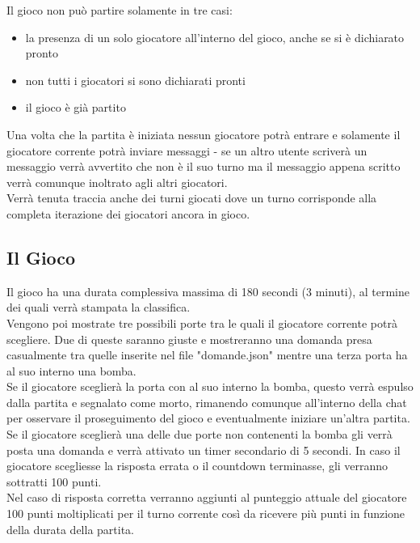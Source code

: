 \documentclass[a4paper,12pt]{report}
\begin{document}
Il gioco non può partire solamente in tre casi:
\begin{itemize}
	\item la presenza di un solo giocatore all'interno del gioco, anche se si è dichiarato pronto
	\item non tutti i giocatori si sono dichiarati pronti
	\item il gioco è già partito
\end{itemize}
Una volta che la partita è iniziata nessun giocatore potrà entrare e solamente il giocatore corrente potrà inviare messaggi - se un altro utente scriverà un messaggio verrà avvertito che non è il suo turno ma il messaggio appena scritto verrà comunque inoltrato agli altri giocatori.\\
Verrà tenuta traccia anche dei turni giocati dove un turno corrisponde alla completa iterazione dei giocatori ancora in gioco.\clearpage

\subsection{Il Gioco}
Il gioco ha una durata complessiva massima di 180 secondi (3 minuti), al termine dei quali verrà stampata la classifica.\\
Vengono poi mostrate tre possibili porte tra le quali il giocatore corrente potrà scegliere. Due di queste saranno giuste e mostreranno una domanda presa casualmente tra quelle inserite nel file "domande.json" mentre una terza porta ha al suo interno una bomba.\\
Se il giocatore sceglierà la porta con al suo interno la bomba, questo verrà espulso dalla partita e segnalato come morto, rimanendo comunque all'interno della chat per osservare il proseguimento del gioco e eventualmente iniziare un'altra partita.\\
Se il giocatore sceglierà una delle due porte non contenenti la bomba gli verrà posta una domanda e verrà attivato un timer secondario di 5 secondi. In caso il giocatore scegliesse la risposta errata o il countdown terminasse, gli verranno sottratti 100 punti.\\
Nel caso di risposta corretta verranno aggiunti al punteggio attuale del giocatore 100 punti moltiplicati per il turno corrente così da ricevere più punti in funzione della durata della partita.\\
\end{document}
